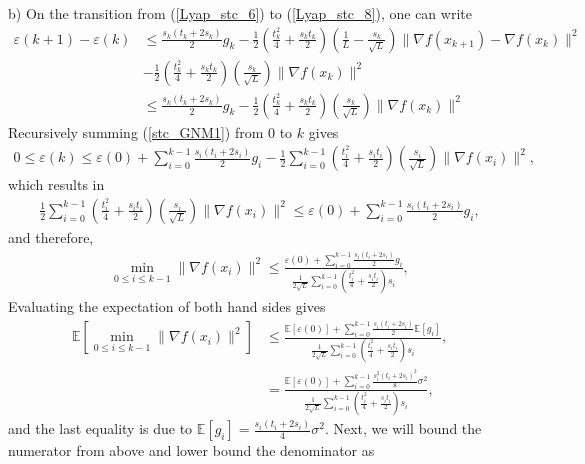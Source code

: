 \documentclass{article}
\theoremstyle{plain}
\theoremstyle{definition}
\theoremstyle{remark}
\begin{document}
b) On the transition from (\ref{Lyap_stc_6}) to (\ref{Lyap_stc_8}), one can write
\begin{align}\label{stc_GNM1}
    \varepsilon(k+1)-\varepsilon(k)&\leq \frac{s_k(t_k+2s_k)}{2}g_k-\frac{1}{2}\left( \frac{t_k^2}{4}+\frac{s_kt_k}{2} \right)(\frac{1}{L}-\frac{s_k}{\sqrt{L}})\|\nabla f(x_{k+1})-\nabla f(x_k)\|^2\nonumber\\
    &-\frac{1}{2}\left(\frac{t_k^2}{4}+\frac{s_kt_k}{2}\right)(\frac{s_k}{\sqrt{L}})\|\nabla f(x_k)\|^2\nonumber\\
    &\leq \frac{s_k(t_k+2s_k)}{2}g_k-\frac{1}{2}\left(\frac{t_k^2}{4}+\frac{s_kt_k}{2}\right)(\frac{s_k}{\sqrt{L}})\|\nabla f(x_k)\|^2
\end{align}
Recursively summing (\ref{stc_GNM1}) from $0$ to $k$ gives
\begin{align}\label{stc_GNM2}
    0\leq\varepsilon(k)\leq \varepsilon(0)+ \sum_{i=0}^{k-1} \frac{s_i(t_i+2s_i)}{2}g_i -\frac{1}{2}\sum_{i=0}^{k-1}\left(\frac{t_i^2}{4}+\frac{s_it_i}{2}\right)(\frac{s_i}{\sqrt{L}})\|\nabla f(x_i)\|^2,
\end{align}
which results in
\begin{align}\label{stc_GNM3}
    \frac{1}{2}\sum_{i=0}^{k-1}\left(\frac{t_i^2}{4}+\frac{s_it_i}{2}\right)(\frac{s_i}{\sqrt{L}})\|\nabla f(x_i)\|^2\leq \varepsilon(0)+ \sum_{i=0}^{k-1} \frac{s_i(t_i+2s_i)}{2}g_i,
\end{align}
and therefore,
\begin{align}\label{stc_GNM4}
    \min_{0\leq i\leq k-1}\|\nabla f(x_i)\|^2 \leq \frac{\varepsilon(0)+ \sum_{i=0}^{k-1} \frac{s_i(t_i+2s_i)}{2}g_i}{\frac{1}{2\sqrt{L}}\sum_{i=0}^{k-1}\left(\frac{t_i^2}{4}+\frac{s_it_i}{2}\right)s_i},
\end{align}
Evaluating the expectation of both hand sides gives
\begin{align}
    \mathbb E\left[\min_{0\leq i\leq k-1}\|\nabla f(x_i)\|^2 \right]&\leq \frac{\mathbb E\left[\varepsilon(0)\right]+ \sum_{i=0}^{k-1} \frac{s_i(t_i+2s_i)}{2}\mathbb E\left[g_i\right]}{\frac{1}{2\sqrt{L}}\sum_{i=0}^{k-1}\left(\frac{t_i^2}{4}+\frac{s_it_i}{2}\right)s_i},\nonumber\\
    &= \frac{\mathbb E\left[\varepsilon(0)\right]+ \sum_{i=0}^{k-1} \frac{s_i^2(t_i+2s_i)^2}{8}\sigma^2}{\frac{1}{2\sqrt{L}}\sum_{i=0}^{k-1}\left(\frac{t_i^2}{4}+\frac{s_it_i}{2}\right)s_i},\nonumber
\end{align}
and the last equality is due to $\mathbb E[g_i]= \frac{s_i(t_i+2s_i)}{4}\sigma^2$. Next, we will bound the numerator from above and lower bound the denominator as 
\end{document}
